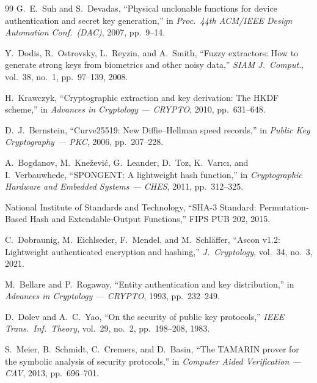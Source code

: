 \documentclass[11pt,a4paper]{article}
\theoremstyle{jrnlplain}
\theoremstyle{jrnldef}
\begin{document}
\begin{thebibliography}{99}
\small
{} G.~E.~Suh and S.~Devadas, ``Physical unclonable functions
for device authentication and secret key generation,'' in \emph{Proc.\ 44th
ACM/IEEE Design Automation Conf.\ (DAC)}, 2007, pp.~9--14.

 Y.~Dodis, R.~Ostrovsky, L.~Reyzin, and A.~Smith, ``Fuzzy
extractors: How to generate strong keys from biometrics and other noisy
data,'' \emph{SIAM J.\ Comput.}, vol.~38, no.~1, pp.~97--139, 2008.

 H.~Krawczyk, ``Cryptographic extraction and key
derivation: The HKDF scheme,'' in \emph{Advances in Cryptology --- CRYPTO},
2010, pp.~631--648.

 D.~J.~Bernstein, ``Curve25519: New Diffie--Hellman
speed records,'' in \emph{Public Key Cryptography --- PKC}, 2006,
pp.~207--228.

 A.~Bogdanov, M.~Kne\v{z}evi\'c, G.~Leander,
D.~Toz, K.~Var\i c\i, and I.~Verbauwhede, ``SPONGENT: A lightweight hash
function,'' in \emph{Cryptographic Hardware and Embedded Systems --- CHES},
2011, pp.~312--325.

 National Institute of Standards and Technology,
``SHA-3 Standard: Permutation-Based Hash and Extendable-Output Functions,''
FIPS PUB 202, 2015.

 C.~Dobraunig, M.~Eichlseder, F.~Mendel, and M.~Schl\"affer,
``Ascon v1.2: Lightweight authenticated encryption and hashing,''
\emph{J.\ Cryptology}, vol.~34, no.~3, 2021.

 M.~Bellare and P.~Rogaway, ``Entity authentication and
key distribution,'' in \emph{Advances in Cryptology --- CRYPTO}, 1993,
pp.~232--249.

 D.~Dolev and A.~C.~Yao, ``On the security of public key
protocols,'' \emph{IEEE Trans.\ Inf.\ Theory}, vol.~29, no.~2, pp.~198--208,
1983.

 S.~Meier, B.~Schmidt, C.~Cremers, and D.~Basin, ``The
TAMARIN prover for the symbolic analysis of security protocols,'' in
\emph{Computer Aided Verification --- CAV}, 2013, pp.~696--701.
\end{thebibliography}
\end{document}
